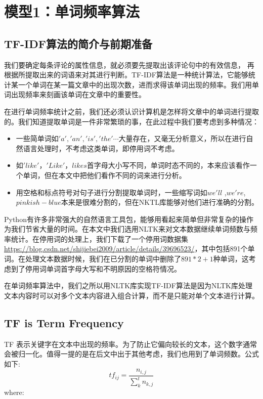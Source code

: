 \documentclass[UTF8]{article}
\begin{document}
\section{模型1：单词频率算法}
\subsection{TF-IDF算法的简介与前期准备}

我们要确定每条评论的属性信息，就必须要先提取出该评论句中的有效信息，
再根据所提取出来的词语来对其进行判断。TF-IDF算法是一种统计算法，它能够统计某一个单词在某一篇文章中的出现次数，进而求得该单词出现的频率。我们用单词出现频率来刻画该单词在文章中的重要性。

在进行单词频率统计之前，我们还必须认识计算机是怎样将文章中的单词进行提取的。我们知道提取单词是一件非常繁琐的事，在此过程中我们要考虑到多种情况：
\begin{itemize}
	\item 一些简单词如$'a','an','is','the'\cdots$大量存在，又毫无分析意义，所以在进行自然语言处理时，不考虑这类单词，即停用词不考虑。
	\item 如$'like'$，$'Like'$，$likes$首字母大小写不同，单词时态不同的，本来应该看作一个单词，但在本文中把他们看作不同的词来进行分析。
	\item 用空格和标点符号对句子进行分割提取单词时，一些缩写词如$we'll$ ,$we're$,$pinkish-blue$本来是很难分割的，但在NKTL库能够对他们进行准确的分割。
\end{itemize}
Python有许多非常强大的自然语言工具包，能够用看起来简单但非常复杂的操作为我们节省大量的时间。在本文中我们选用NLTK来对文本数据继续单词频数与频率统计。在停用词的处理上，我们下载了一个停用词数据集\url{https://blog.csdn.net/shijiebei2009/article/details/39696523/}，其中包括891个单词。在处理文本数据时候，我们在已分割的单词中删除了$891*2+1$种单词，这考虑到了停用词单词首字母大写和不明原因的空格符情况。

在单词频率算法中，我们之所以用NLTK库实现TF-IDF算法是因为NLTK库处理文本内容时可以对多个文本内容进入组合计算，而不是只能对单个文本进行计算。

\subsection{TF is Term Frequency}
TF 表示关键字在文本中出现的频率。为了防止它偏向较长的文本，这个数字通常会被归一化。值得一提的是在后文中出于其他考虑，我们也用到了单词频数。公式如下:
\begin{equation}
t f_{i j}=\frac{n_{i, j}}{\sum_{k}^t n_{k, j}}
\end{equation}
where:
\end{document}
